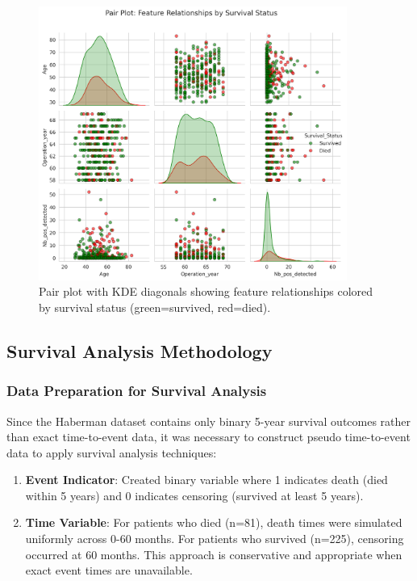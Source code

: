 \documentclass[12pt,a4paper]{article}
\begin{document}
\begin{figure}[H]
\centering
\includegraphics[width=0.9\textwidth]{pairplot_survival_status.png}
\caption{Pair plot with KDE diagonals showing feature relationships colored by survival status (green=survived, red=died).}
\label{fig:pairplot}
\end{figure}

\subsection{Survival Analysis Methodology}

\subsubsection{Data Preparation for Survival Analysis}

Since the Haberman dataset contains only binary 5-year survival outcomes rather than exact time-to-event data, it was necessary to construct pseudo time-to-event data to apply survival analysis techniques:

\begin{enumerate}
    \item \textbf{Event Indicator}: Created binary variable where 1 indicates death (died within 5 years) and 0 indicates censoring (survived at least 5 years).
    
    \item \textbf{Time Variable}: For patients who died (n=81), death times were simulated uniformly across 0-60 months. For patients who survived (n=225), censoring occurred at 60 months. This approach is conservative and appropriate when exact event times are unavailable.
\end{enumerate}
\end{document}
